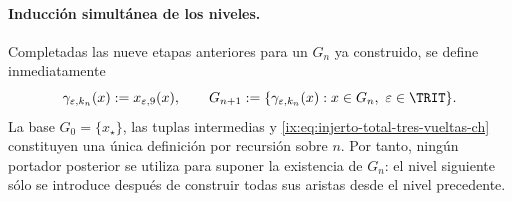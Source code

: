 \paragraph{Inducción simultánea de los niveles.}
Completadas las nueve etapas anteriores para un \(G_n\) ya construido,
se define inmediatamente
\begin{equation}
 \gamma_{\varepsilon,k_n}(x):=x_{\varepsilon,9}(x),\qquad
 G_{n+1}:=\{\gamma_{\varepsilon,k_n}(x):
       x\in G_n,\ \varepsilon\in\TRIT\}.
 \label{ix:eq:injerto-total-tres-vueltas-ch}
\end{equation}
\label{ix:eq:tres-vueltas-tpk-ch}
La base \(G_0=\{x_\star\}\), las tuplas intermedias y
\eqref{ix:eq:injerto-total-tres-vueltas-ch} constituyen una única definición por
recursión sobre \(n\). Por tanto, ningún portador posterior se utiliza para
suponer la existencia de \(G_n\): el nivel siguiente sólo se introduce
después de construir todas sus aristas desde el nivel precedente.

